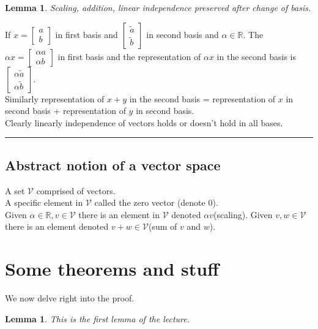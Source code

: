 \documentclass[twoside]{article}
\newtheorem{lemma}[theorem]{Lemma}
\newenvironment{proof}{{\bf Proof:}}{\hfill\rule{2mm}{2mm}}
\begin{document}
\begin{lemma}Scaling, addition, linear independence preserved after change of basis.\end{lemma}
\begin{proof}
If $x=
\begin{bmatrix}
a\\
b
\end{bmatrix}$
 in first basis and
$\begin{bmatrix}
           \widetilde{a}\\
           \widetilde{b}
\end{bmatrix}$ in second basis and $\alpha \in \mathbb{R}$.
The $\alpha x = \begin{bmatrix}
\alpha a\\
\alpha b
\end{bmatrix}$ in first basis and the representation of $\alpha x$ in the second basis is $\begin{bmatrix}
\alpha \widetilde{a}\\
\alpha \widetilde{b}
\end{bmatrix}$.\\
Similarly representation of $x +y$ in the second basis = representation of $x$ in second basis + representation of $y$ in second basis.\\
Clearly linearly independence of vectors holds or doesn't hold in all bases.
\end{proof}
\subsection{Abstract notion of a vector space}
A set $\mathcal{V}$ comprised of vectors.\\
A specific element in \(\mathcal{V}\) called the zero vector (denote 0).\\
Given $\alpha \in \mathbb{R}, v \in  \mathcal{V}$ there is an element in  $\mathcal{V}$ denoted $\alpha v$(scaling).
Given $v,w \in  \mathcal{V}$ there is an element denoted $v+w\in  \mathcal{V}$(sum of $v$ and $w$).


\section{Some theorems and stuff}

We now delve right into the proof.

\begin{lemma}
This is the first lemma of the lecture.
\end{lemma}
\end{document}
